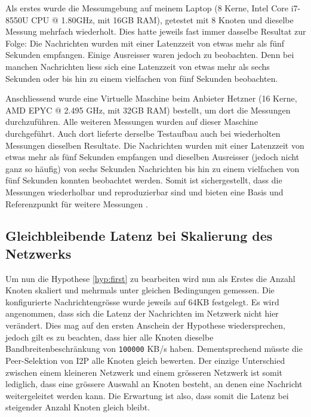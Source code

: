 Als erstes wurde die Messumgebung auf meinem Laptop (8 Kerne, Intel Core i7-8550U CPU @ 1.80GHz, mit 16GB RAM),
getestet mit 8 Knoten und dieselbe Messung mehrfach wiederholt.
Dies hatte jeweils fast immer dasselbe Resultat zur Folge:
Die Nachrichten wurden mit einer Latenzzeit von etwas mehr als fünf Sekunden empfangen.
Einige Ausreisser waren jedoch zu beobachten.
Denn bei manchen Nachrichten liess sich eine Latenzzeit von etwas mehr als sechs Sekunden oder bis hin zu einem vielfachen von fünf Sekunden beobachten.

Anschliessend wurde eine Virtuelle Maschine beim Anbieter Hetzner (16 Kerne, AMD EPYC @ 2.495 GHz, mit 32GB RAM) bestellt, um dort die Messungen durchzuführen.
Alle weiteren Messungen wurden auf dieser Maschine durchgeführt.
Auch dort lieferte derselbe Testaufbau auch bei wiederholten Messungen dieselben Resultate.
Die Nachrichten wurden mit einer Latenzzeit von etwas mehr als fünf Sekunden empfangen
und dieselben Ausreisser (jedoch nicht ganz so häufig) von sechs Sekunden Nachrichten bis hin zu einem vielfachen von fünf Sekunden konnten beobachtet werden.
Somit ist sichergestellt, dass die Messungen wiederholbar und reproduzierbar sind und bieten eine Basis und Referenzpunkt für weitere Messungen .

%
%
%


\subsection{Gleichbleibende Latenz bei Skalierung des Netzwerks}\label{sec:messung_latenz}

Um nun die Hypothese \ref{hyp:first} zu bearbeiten wird nun als Erstes die Anzahl Knoten skaliert
und mehrmals unter gleichen Bedingungen gemessen.
Die konfigurierte Nachrichtengrösse wurde jeweils auf 64KB festgelegt.
Es wird angenommen, dass sich die Latenz der Nachrichten im Netzwerk nicht hier verändert.
Dies mag auf den ersten Anschein der Hypothese wiedersprechen, jedoch gilt es zu beachten, dass hier alle Knoten dieselbe Bandbreitenbeschränkung von \lstinline|100000| KB/s haben.
Dementsprechend müsste die Peer-Selektion von I2P alle Knoten gleich bewerten.
Der einzige Unterschied zwischen einem kleineren Netzwerk und einem grösseren Netzwerk ist somit lediglich,
dass eine grössere Auswahl an Knoten besteht, an denen eine Nachricht weitergeleitet werden kann.
Die Erwartung ist also, dass somit die Latenz bei steigender Anzahl Knoten gleich bleibt.

